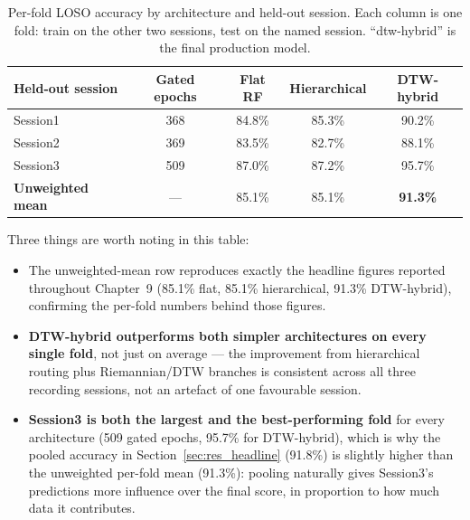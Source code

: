 \begin{table}[htbp]
\centering
\caption{Per-fold LOSO accuracy by architecture and held-out
session. Each column is one fold: train on the other two sessions,
test on the named session. ``dtw-hybrid'' is the final production
model.}
\label{tab:perfold_accuracy}
\renewcommand{\arraystretch}{1.3}
\begin{tabular}{l c c c c}
\toprule
\textbf{Held-out session} & \textbf{Gated epochs} &
\textbf{Flat RF} & \textbf{Hierarchical} & \textbf{DTW-hybrid} \\
\midrule
Session1 & 368 & 84.8\% & 85.3\% & 90.2\% \\
Session2 & 369 & 83.5\% & 82.7\% & 88.1\% \\
Session3 & 509 & 87.0\% & 87.2\% & 95.7\% \\
\midrule
\textbf{Unweighted mean} & --- & 85.1\% & 85.1\% &
\textbf{91.3\%} \\
\bottomrule
\end{tabular}
\end{table}

Three things are worth noting in this table:

\begin{itemize}[leftmargin=*]
    \item The unweighted-mean row reproduces exactly the headline
    figures reported throughout Chapter~9 (85.1\% flat, 85.1\%
    hierarchical, 91.3\% DTW-hybrid), confirming the per-fold
    numbers behind those figures.
    \item \textbf{DTW-hybrid outperforms both simpler architectures
    on every single fold}, not just on average --- the improvement
    from hierarchical routing plus Riemannian/DTW branches is
    consistent across all three recording sessions, not an artefact
    of one favourable session.
    \item \textbf{Session3 is both the largest and the
    best-performing fold} for every architecture (509 gated
    epochs, 95.7\% for DTW-hybrid), which is why the pooled
    accuracy in Section~\ref{sec:res_headline} (91.8\%) is slightly
    higher than the unweighted per-fold mean (91.3\%): pooling
    naturally gives Session3's predictions more influence over the
    final score, in proportion to how much data it contributes.
\end{itemize}

